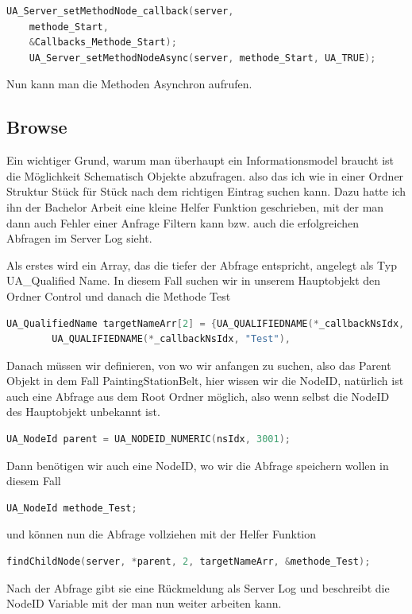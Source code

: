 \begin{lstlisting}[language=C]
	UA_Server_setMethodNode_callback(server,
	methode_Start,
	&Callbacks_Methode_Start);
	UA_Server_setMethodNodeAsync(server, methode_Start, UA_TRUE);
\end{lstlisting}

Nun kann man die Methoden Asynchron aufrufen.

\subsection{Browse}
Ein wichtiger Grund, warum man überhaupt ein Informationsmodel braucht ist die Möglichkeit Schematisch Objekte abzufragen. also das ich wie in einer Ordner Struktur Stück für Stück nach dem richtigen Eintrag suchen kann. Dazu hatte ich ihn der Bachelor Arbeit eine kleine Helfer Funktion geschrieben, mit der man dann auch Fehler einer Anfrage Filtern kann bzw. auch die erfolgreichen Abfragen im Server Log sieht.

Als erstes wird ein Array, das die tiefer der Abfrage entspricht, angelegt als Typ UA\_Qualified Name. In diesem Fall suchen wir in unserem Hauptobjekt den Ordner Control und danach die Methode Test

\begin{lstlisting}[language=C]
	UA_QualifiedName targetNameArr[2] = {UA_QUALIFIEDNAME(*_callbackNsIdx, "Control"), 
		UA_QUALIFIEDNAME(*_callbackNsIdx, "Test"), 
	\end{lstlisting}
	Danach müssen wir definieren, von wo wir anfangen zu suchen, also das Parent Objekt in dem Fall PaintingStationBelt, hier wissen wir die NodeID, natürlich ist auch eine Abfrage aus dem Root Ordner möglich, also wenn selbst die NodeID des Hauptobjekt unbekannt ist.
	\begin{lstlisting}[language=C]
		UA_NodeId parent = UA_NODEID_NUMERIC(nsIdx, 3001);
	\end{lstlisting}
	Dann benötigen wir auch eine NodeID, wo wir die Abfrage speichern wollen in diesem Fall 
	\begin{lstlisting}[language=C]
		UA_NodeId methode_Test;
	\end{lstlisting}
	und können nun die Abfrage vollziehen mit der Helfer Funktion
	\begin{lstlisting}[language=C]
		findChildNode(server, *parent, 2, targetNameArr, &methode_Test);
	\end{lstlisting}
	Nach der Abfrage gibt sie eine Rückmeldung als Server Log und beschreibt die NodeID Variable mit der man nun weiter arbeiten kann.
	
